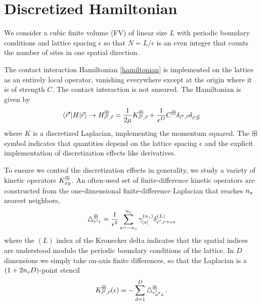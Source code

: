 \section{Discretized Hamiltonian}\label{sec:hamiltonian}

We consider a cubic finite volume (FV) of linear size $L$ with periodic boundary conditions and lattice spacing $\epsilon$ so that $N=L/\epsilon$ is an even integer that counts the number of sites in one spatial direction.

The contact interaction Hamiltonian \eqref{hamiltonian} is implemented on the lattice as an entirely local operator, vanishing everywhere except at the origin where it is of strength $C$.
The contact interaction is not smeared.
The Hamiltonian is given by
\begin{equation}
    \left\langle \vec{r}' \middle| H \middle| \vec{r} \right\rangle
    \rightarrow
    H_{\vec{r}',\vec{r}}^\boxplus
    =
    \frac{1}{2\mu} K_{\vec{r}',\vec{r}}^\boxplus + \frac{1}{\epsilon^D} C^\boxplus \delta_{\vec{r}',\vec{r}} \delta_{\vec{r},\vec{0}}
\end{equation}
where $K$ is a discretized Laplacian, implementing the momentum squared.
The $\boxplus$ symbol indicates that quantities depend on the lattice spacing $\epsilon$ and the explicit implementation of discretization effects like derivatives.

To ensure we control the discretization effects in generality, we study a variety of kinetic operators $K_{xy}^\boxplus$.
An often-used set of finite-difference kinetic operators are constructed from the one-dimensional finite-difference Laplacian that reaches ${n_s}$ nearest neighbors,
\begin{equation}
    \mathop{}\!\mathbin\bigtriangleup^\boxplus_{r'r} = \frac{1}{\epsilon^2}\sum_{s=-{n_s}}^{{n_s}} \gamma_{\left| s \right|}^{({n_s})} \delta_{r',r+\epsilon s}^{(L)}
\end{equation}
where the $(L)$ index of the Kronecker delta indicates that the spatial indices are understood modulo the periodic boundary conditions of the lattice.
In $D$ dimensions we simply take on-axis finite differences, so that the Laplacian is a $(1+2{n_s} D)$-point stencil
\begin{equation}\label{eq:kinetic}
    K_{\vec{r}',\vec{r}}^\boxplus(\epsilon)
    =
    - \sum_{d=1}^D \mathop{}\!\mathbin\bigtriangleup_{r_d'r_d^{}}^\boxplus
    \, .
\end{equation}

